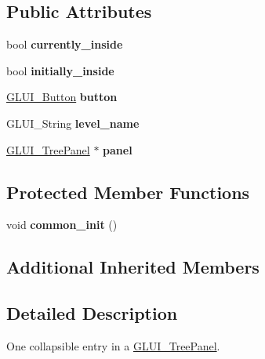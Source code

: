 \subsection*{Public Attributes}
\begin{DoxyCompactItemize}
\item 
\hypertarget{class_g_l_u_i___tree_ab8c9cfc5885edf05eb1d516e61ebd7dc}{bool {\bfseries currently\+\_\+inside}}\label{class_g_l_u_i___tree_ab8c9cfc5885edf05eb1d516e61ebd7dc}

\item 
\hypertarget{class_g_l_u_i___tree_a920c5916bd08173bd22043e1f31b85d5}{bool {\bfseries initially\+\_\+inside}}\label{class_g_l_u_i___tree_a920c5916bd08173bd22043e1f31b85d5}

\item 
\hypertarget{class_g_l_u_i___tree_ab57f8d77aea6238adb73bc2572b030b8}{\hyperlink{class_g_l_u_i___button}{G\+L\+U\+I\+\_\+\+Button} {\bfseries button}}\label{class_g_l_u_i___tree_ab57f8d77aea6238adb73bc2572b030b8}

\item 
\hypertarget{class_g_l_u_i___tree_a4047a0265f95953a1a029ec0f3dda5c3}{G\+L\+U\+I\+\_\+\+String {\bfseries level\+\_\+name}}\label{class_g_l_u_i___tree_a4047a0265f95953a1a029ec0f3dda5c3}

\item 
\hypertarget{class_g_l_u_i___tree_a4ba552062c7dfae187a9d346f8b42f08}{\hyperlink{class_g_l_u_i___tree_panel}{G\+L\+U\+I\+\_\+\+Tree\+Panel} $\ast$ {\bfseries panel}}\label{class_g_l_u_i___tree_a4ba552062c7dfae187a9d346f8b42f08}

\end{DoxyCompactItemize}
\subsection*{Protected Member Functions}
\begin{DoxyCompactItemize}
\item 
\hypertarget{class_g_l_u_i___tree_a7d2f013c76e7bd7a66336123f9741e77}{void {\bfseries common\+\_\+init} ()}\label{class_g_l_u_i___tree_a7d2f013c76e7bd7a66336123f9741e77}

\end{DoxyCompactItemize}
\subsection*{Additional Inherited Members}


\subsection{Detailed Description}
One collapsible entry in a \hyperlink{class_g_l_u_i___tree_panel}{G\+L\+U\+I\+\_\+\+Tree\+Panel}. 

